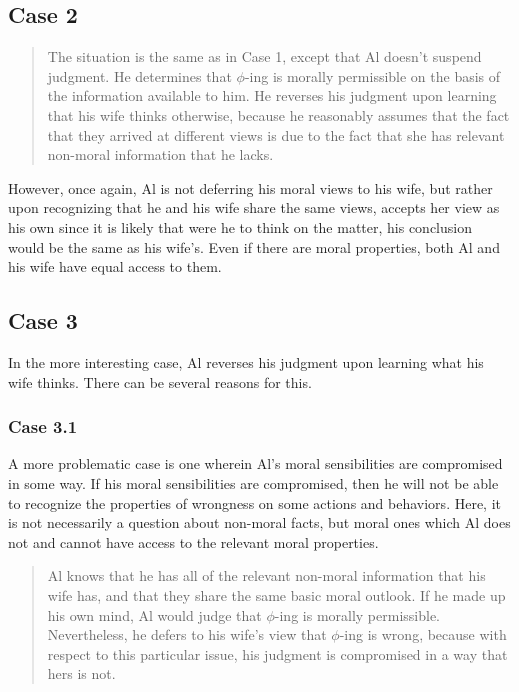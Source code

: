 \documentclass[phdthesis,12pt,final]{wuthesis}
\theoremstyle{definition}
\theoremstyle{definition}
\theoremstyle{definition}
\theoremstyle{definition}
\theoremstyle{remark}
\begin{document}
\subsection*{Case 2}\label{case-2}

\begin{quote}
The situation is the same as in Case 1, except that Al doesn't suspend judgment. He determines that \(\phi\)-ing is morally permissible on the basis of the information available to him. He reverses his judgment upon learning that his wife thinks otherwise, because he reasonably assumes that the fact that they arrived at different views is due to the fact that she has relevant non-moral information that he lacks.
\end{quote}

However, once again, Al is not deferring his moral views to his wife, but rather upon recognizing that he and his wife share the same views, accepts her view as his own since it is likely that were he to think on the matter, his conclusion would be the same as his wife's. Even if there are moral properties, both Al and his wife have equal access to them.

\subsection*{Case 3}\label{case-3}

In the more interesting case, Al reverses his judgment upon learning what his wife thinks. There can be several reasons for this.

\subsubsection*{Case 3.1}\label{case-3.1}

A more problematic case is one wherein Al's moral sensibilities are compromised in some way. If his moral sensibilities are compromised, then he will not be able to recognize the properties of wrongness on some actions and behaviors. Here, it is not necessarily a question about non-moral facts, but moral ones which Al does not and cannot have access to the relevant moral properties.

\begin{quote}
Al knows that he has all of the relevant non-moral information that his wife has, and that they share the same basic moral outlook. If he made up his own mind, Al would judge that \(\phi\)-ing is morally permissible. Nevertheless, he defers to his wife's view that \(\phi\)-ing is wrong, because with respect to this particular issue, his judgment is compromised in a way that hers is not.
\end{quote}
\end{document}
